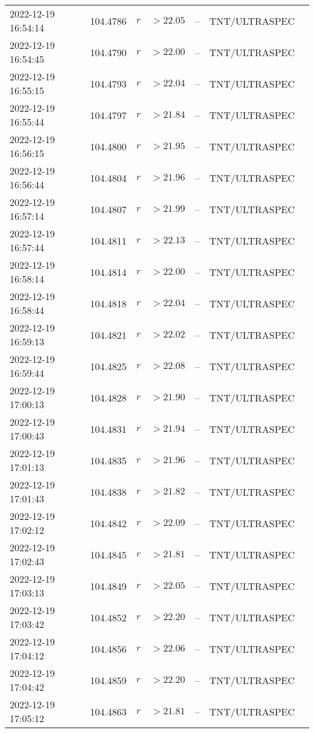 \documentclass{nature_plusfigure}
\begin{document}
\begin{supplement}
\begin{center}
\begin{longtable}{lllllll}
2022-12-19 16:54:14 & 104.4786 & $r$ & $>22.05$ & -- & TNT/ULTRASPEC &  \\ 
2022-12-19 16:54:45 & 104.4790 & $r$ & $>22.00$ & -- & TNT/ULTRASPEC &  \\ 
2022-12-19 16:55:15 & 104.4793 & $r$ & $>22.04$ & -- & TNT/ULTRASPEC &  \\ 
2022-12-19 16:55:44 & 104.4797 & $r$ & $>21.84$ & -- & TNT/ULTRASPEC &  \\ 
2022-12-19 16:56:15 & 104.4800 & $r$ & $>21.95$ & -- & TNT/ULTRASPEC &  \\ 
2022-12-19 16:56:44 & 104.4804 & $r$ & $>21.96$ & -- & TNT/ULTRASPEC &  \\ 
2022-12-19 16:57:14 & 104.4807 & $r$ & $>21.99$ & -- & TNT/ULTRASPEC &  \\ 
2022-12-19 16:57:44 & 104.4811 & $r$ & $>22.13$ & -- & TNT/ULTRASPEC &  \\ 
2022-12-19 16:58:14 & 104.4814 & $r$ & $>22.00$ & -- & TNT/ULTRASPEC &  \\ 
2022-12-19 16:58:44 & 104.4818 & $r$ & $>22.04$ & -- & TNT/ULTRASPEC &  \\ 
2022-12-19 16:59:13 & 104.4821 & $r$ & $>22.02$ & -- & TNT/ULTRASPEC &  \\ 
2022-12-19 16:59:44 & 104.4825 & $r$ & $>22.08$ & -- & TNT/ULTRASPEC &  \\ 
2022-12-19 17:00:13 & 104.4828 & $r$ & $>21.90$ & -- & TNT/ULTRASPEC &  \\ 
2022-12-19 17:00:43 & 104.4831 & $r$ & $>21.94$ & -- & TNT/ULTRASPEC &  \\ 
2022-12-19 17:01:13 & 104.4835 & $r$ & $>21.96$ & -- & TNT/ULTRASPEC &  \\ 
2022-12-19 17:01:43 & 104.4838 & $r$ & $>21.82$ & -- & TNT/ULTRASPEC &  \\ 
2022-12-19 17:02:12 & 104.4842 & $r$ & $>22.09$ & -- & TNT/ULTRASPEC &  \\ 
2022-12-19 17:02:43 & 104.4845 & $r$ & $>21.81$ & -- & TNT/ULTRASPEC &  \\ 
2022-12-19 17:03:13 & 104.4849 & $r$ & $>22.05$ & -- & TNT/ULTRASPEC &  \\ 
2022-12-19 17:03:42 & 104.4852 & $r$ & $>22.20$ & -- & TNT/ULTRASPEC &  \\ 
2022-12-19 17:04:12 & 104.4856 & $r$ & $>22.06$ & -- & TNT/ULTRASPEC &  \\ 
2022-12-19 17:04:42 & 104.4859 & $r$ & $>22.20$ & -- & TNT/ULTRASPEC &  \\ 
2022-12-19 17:05:12 & 104.4863 & $r$ & $>21.81$ & -- & TNT/ULTRASPEC &  \\ 

\end{longtable}
\end{center}
\end{supplement}
\end{document}
